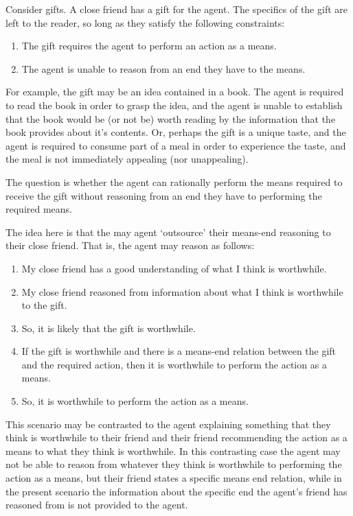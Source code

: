 \documentclass[10pt]{article}
\begin{document}
Consider gifts.
A close friend has a gift for the agent.
The specifics of the gift are left to the reader, so long as they satisfy the following constraints:
\begin{enumerate}
\item\label{gift:means} The gift requires the agent to perform an action as a means.
\item\label{gift:relation} The agent is unable to reason from an end they have to the means.
\end{enumerate}

For example, the gift may be an idea contained in a book.
The agent is required to read the book in order to grasp the idea, and the agent is unable to establish that the book would be (or not be) worth reading by the information that the book provides about it's contents.
Or, perhaps the gift is a unique taste, and the agent is required to consume part of a meal in order to experience the taste, and the meal is not immediately appealing (nor unappealing).

The question is whether the agent can rationally perform the means required to receive the gift without reasoning from an end they have to performing the required means.

The idea here is that the may agent `outsource' their means-end reasoning to their close friend.
That is, the agent may reason as follows:
\begin{enumerate}
\item My close friend has a good understanding of what I think is worthwhile.
\item My close friend reasoned from information about what I think is worthwhile to the gift.
\item So, it is likely that the gift is worthwhile.
\item If the gift is worthwhile and there is a means-end relation between the gift and the required action, then it is worthwhile to perform the action as a means.
\item So, it is worthwhile to perform the action as a means.
\end{enumerate}

This scenario may be contrasted to the agent explaining something that they think is worthwhile to their friend and their friend recommending the action as a means to what they think is worthwhile.
In this contrasting case the agent may not be able to reason from whatever they think is worthwhile to performing the action as a means, but their friend states a specific means end relation, while in the present scenario the information about the specific end the agent's friend has reasoned from is not provided to the agent.
\end{document}
